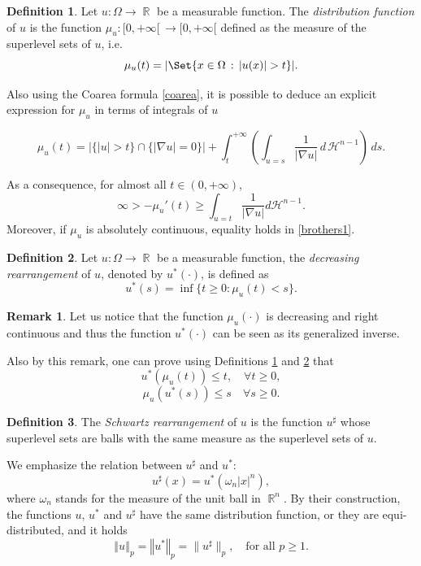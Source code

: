 \documentclass[oneside,a4paper,11pt,notitlepage]{article}
\newcommand{\abs}[1]{{\left|#1\right|}}
\newcommand{\norma}[1]{{\left\Vert#1\right\Vert}}
\theoremstyle{definition}
\newtheorem{definizione}{Definition}[section]
\theoremstyle{plain}
\theoremstyle{definition}
\newtheorem{oss}[esempio]{Remark}
\DeclareMathOperator{\R}{\mathbb{R}}
\begin{document}
 \begin{definizione}\label{distribution:function}
	Let $u: \Omega \to \R$ be a measurable function. The \emph{distribution function} of $u$ is the function $\mu_u : [0,+\infty[\, \to [0, +\infty[$ defined as the measure of the superlevel sets of $u$, i.e.
	$$
	\mu_u(t)= \abs{\Set{x \in \Omega \, :\,  \abs{u(x)} > t}}.
	$$
\end{definizione}
Also using the Coarea formula \eqref{coarea}, it is possible to deduce an explicit expression for $\mu_u$ in terms of integrals of $u$

\begin{equation*}
    \mu_u(t)=\abs{\{\abs{u}>t\}\cap \{|\nabla u |=0\}}+ \int_t^{+\infty} \left(\int_{u=s}\frac{1}{\abs{\nabla u}}\, d\, \mathcal{H}^{n-1}\right)\, ds.
\end{equation*}

As a consequence, for almost all $t\in (0,+\infty)$,
    \begin{equation}\label{brothers1}
        \infty>-\mu_u'(t)\geq\displaystyle \int_{u=t}\dfrac{1}{|\nabla u|}d\mathcal{H}^{n-1}.
    \end{equation}
Moreover, if $\mu_u$ is absolutely continuous, equality holds in \eqref{brothers1}.


\begin{definizione} \label{decreasing:rear}
	Let $u: \Omega \to \R$ be a measurable function, the \emph{decreasing rearrangement} of $u$, denoted by $u^\ast(\cdot)$, is defined as
$$u^*(s)=\inf\{t\geq 0:\mu_u(t)<s\}.$$
	\end{definizione}
 \begin{oss}
	Let us notice that the function $\mu_u(\cdot)$ is decreasing and right continuous and thus the function $u^\ast(\cdot)$ can be seen as its generalized inverse.
 \end{oss}
 Also by this remark, one can prove using Definitions \ref{distribution:function} and \ref{decreasing:rear} that
	 $$u^\ast (\mu_u(t)) \leq t, \quad \forall t\ge 0,$$ 
  $$\mu_u (u^\ast(s)) \leq s \quad \forall s \ge 0.$$ 
	\begin{definizione}
	 The \emph{Schwartz rearrangement} of $u$ is the function $u^\sharp $ whose superlevel sets are balls with the same measure as the superlevel sets of $u$. 
	\end{definizione}
		We emphasize the relation between $u^\sharp$ and $u^*$:
	$$u^\sharp (x)= u^*(\omega_n\abs{x}^n),$$
 where $\omega_n$ stands for the measure of the unit ball in $\R^n$.
  By their construction, the functions $u$, $u^*$ and $u^\sharp$ have the same distribution function, or they are equi-distributed, and it holds
$$ \displaystyle{\norma{u}_{p}=\norma{u^*}_{p}=\lVert{u^\sharp}\rVert_{p}}, \quad \text{for all } p\ge1.$$
\end{document}
